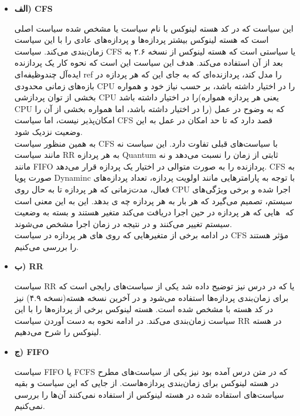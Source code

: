 \documentclass{article}
\begin{document}
\begin{itemize}

\item \textbf{الف) CFS}

این سیاست که در کد هسته لینوکس با نام سیاست  یا  مشخص شده سیاست اصلی است که هسته لینوکس بیشتر پردازه‌ها و پردازه‌های عادی را با این سیاست زمان‌بندی می‌کند. سیاست CFS یا  سیاستی است که هسته لینوکس از نسخه ۲.۶ به بعد از آن استفاده می‌کند. هدف این سیاست این است که نحوه کار یک پردازنده ایده‌آل چندوظیفه‌‌ای ref را مدل کند، پردازنده‌ای که به جای این که هر پردازه در بازه‌های زمانی محدودی CPU را در اختیار داشته باشد، بر حسب نیاز خود و همواره بخشی از توان پردازشی CPU را در اختیار داشته باشد(یعنی هر پردازه همواره CPU را در اختیار داشته باشد، اما همواره بخشی از آن‌ را) که به وضوح در عمل امکان‌پذیر نیست، اما سیاست CFS قصد دارد که تا حد امکان در عمل به این وضعیت نزدیک شود.
\\
به همین منظور سیاست CFS با سیاست‌های قبلی تفاوت دارد. این سیاست نه مانند سیاست RR به هر پردازه Quantum ثابتی از زمان را نسبت می‌دهد و نه مانند FIFO پردازنده را به صورت متوالی در اختیار یک پردازه قرار می‌دهد. CFS به صورت پویا  Dynaminc با توجه به پارامتر‌هایی مانند اولویت پردازه، تعداد پردازه‌های فعال، مدت‌زمانی که هر پردازه تا به حال روی CPU اجرا شده و برخی ویژگی‌های سیستم، تصمیم می‌گیرد که هر بار به هر پردازه چه ی بدهد. این به این معنی است که ‌ هایی که هر پردازه در حین اجرا دریافت می‌کند متغیر هستند و بسته به وضعیت سیستم تغییر می‌کنند و در نتیجه در زمان اجرا مشخص می‌شوند.
\\
در ادامه برخی از متغیر‌هایی که روی  های هر پردازه در سیاست CFS مؤثر هستند را بررسی می‌کنیم.

\item \textbf{ب) RR}

سیاست RR یا  که در درس نیز توضیح داده شد یکی از سیاست‌های رایجی است که برای زمان‌بندی پردازه‌ها استفاده می‌شود و در آخرین نسخه هسته(نسخه ۴.۹) نیز در کد هسته با  مشخص شده است. هسته لینوکس برخی از پردازه‌ها را با این سیاست زمان‌بندی می‌کند. در ادامه نحوه به دست آوردن  سیاست RR در هسته لینوکس را شرح می‌دهیم.

\item \textbf{ج) FIFO}

سیاست FIFO یا FCFS که در متن درس آمده بود نیز یکی از سیاست‌های مطرح در هسته لینوکس برای زمان‌بندی پردازه‌هاست. از جایی که این سیاست و بقیه سیاست‌های استفاده شده در هسته لینوکس از  استفاده نمی‌کنند آن‌ها را بررسی نمی‌کنیم.

\end{itemize}
\end{document}
